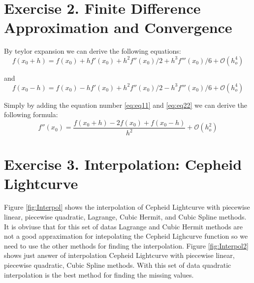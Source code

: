 \documentclass[10pt]{article}
\begin{document}
\section{Exercise 2. Finite Difference Approximation and Convergence}

By teylor expansion we can derive the following equations:\\

\begin{equation}\label{eq:eq11}
 f(x_0+h) = f(x_0) + hf'(x_0) + h^2f''(x_0)/2 + h^3f'''(x_0)/6 + \mathcal{O}(h^4_o)  
\end{equation}

and\\

\begin{equation}\label{eq:eq22}
 f(x_0-h) = f(x_0) - hf'(x_0) + h^2f''(x_0)/2 - h^3f'''(x_0)/6 + \mathcal{O}(h^4_o)  
\end{equation}

Simply by adding the equation number \ref{eq:eq11} and \ref{eq:eq22} we can derive the following formula:\\

\begin{equation}
f''(x_0) = \frac{f(x_0+h) - 2f(x_0) + f(x_0-h)}{ h^2}  + \mathcal{O}(h^2_o)  
\end{equation}


\section{Exercise 3. Interpolation: Cepheid Lightcurve}


Figure \ref{fig:Interpol} shows the interpolation of Cepheid Lightcurve with piecewise linear, piecewise quadratic, Lagrange, Cubic Hermit, and Cubic Spline methods. It is obviuse that for this set of datas Lagrange and Cubic Hermit methods are not a good appraximation for intepolating the Cepheid Lighcurve function so we need to use the other methods for finding the interpolation. Figure \ref{fig:Interpol2} shows just answer of interpolation Cepheid Lightcurve with piecewise linear, piecewise quadratic, Cubic Spline methods. With this set of data quadratic interpolation is the best method for finding the missing values. \\
\end{document}
